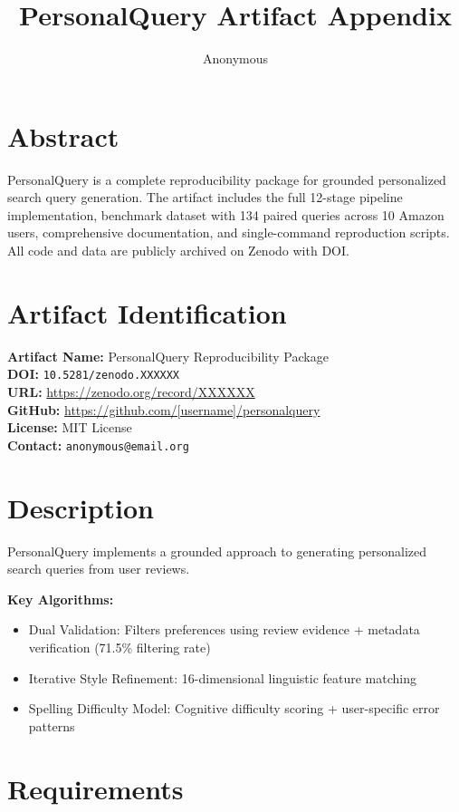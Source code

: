 \documentclass[11pt]{article}
\title{\textbf{PersonalQuery Artifact Appendix}}
\author{Anonymous}
\begin{document}
\maketitle

\section{Abstract}

PersonalQuery is a complete reproducibility package for grounded personalized search query generation. The artifact includes the full 12-stage pipeline implementation, benchmark dataset with 134 paired queries across 10 Amazon users, comprehensive documentation, and single-command reproduction scripts. All code and data are publicly archived on Zenodo with DOI.

\section{Artifact Identification}

\textbf{Artifact Name:} PersonalQuery Reproducibility Package\\
\textbf{DOI:} \texttt{10.5281/zenodo.XXXXXX}\\
\textbf{URL:} \url{https://zenodo.org/record/XXXXXX}\\
\textbf{GitHub:} \url{https://github.com/[username]/personalquery}\\
\textbf{License:} MIT License\\
\textbf{Contact:} \texttt{anonymous@email.org}

\section{Description}

PersonalQuery implements a grounded approach to generating personalized search queries from user reviews.

\textbf{Key Algorithms:}
\begin{itemize}
\item Dual Validation: Filters preferences using review evidence + metadata verification (71.5\% filtering rate)
\item Iterative Style Refinement: 16-dimensional linguistic feature matching
\item Spelling Difficulty Model: Cognitive difficulty scoring + user-specific error patterns
\end{itemize}

\section{Requirements}
\end{document}
